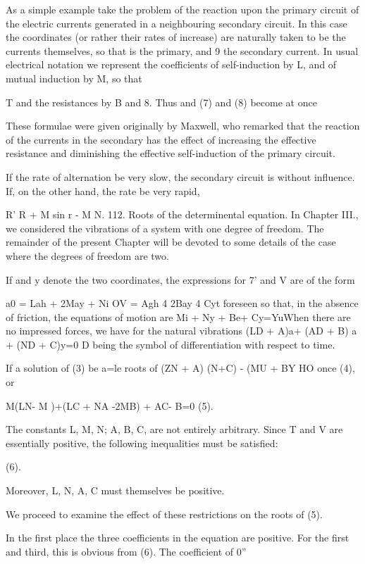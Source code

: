 As a simple example take the problem of the reaction upon
the primary circuit of the electric currents generated in a neighbouring
secondary circuit. In this case the coordinates
(or rather their rates of increase) are naturally taken to be the currents
themselves, so that is the primary, and 9 the secondary
current. In usual electrical notation we represent the coefficients
of self-induction by L, and of mutual induction by M, so that

T and the resistances by B and 8. Thus and (7) and (8) become at once

These formulae were given originally by Maxwell, who remarked
that the reaction of the currents in the secondary has the effect
of increasing the effective resistance and diminishing the effective
self-induction of the primary circuit.

If the rate of alternation be very slow, the secondary circuit is
without influence. If, on the other hand, the rate be very rapid,

R' R + M sin r - M N.
112. Roots of the determinental equation.  In Chapter III., we considered the
vibrations of a system with one degree of freedom. The remainder of the present
Chapter will be devoted to some details of the case where the degrees of
freedom are two.

If and y denote the two coordinates, the expressions for 7' and V are of the
form

a0 = Lah + 2May + Ni OV = Agh 4 2Bay 4 Cyt foreseen so that, in the absence of
friction, the equations of motion are Mi + Ny + Be+ Cy=YuWhen there are no
impressed forces, we have for the natural vibrations (LD + A)a+ (AD + B) a +
(ND + C)y=0 D being the symbol of differentiation with respect to time.

If a solution of (3) be a=le roots of (ZN + A) (N+C) - (MU + BY HO once (4), or

M(LN- M )+(LC + NA -2MB) + AC- B=0 (5).

The constants L, M, N; A, B, C, are not entirely arbitrary. Since T and V are
essentially positive, the following inequalities must be satisfied:

(6).

Moreover, L, N, A, C must themselves be positive.

We proceed to examine the effect of these restrictions on the roots of (5).

In the first place the three coefficients in the equation are positive.  For
the first and third, this is obvious from (6). The coefficient of 0''

